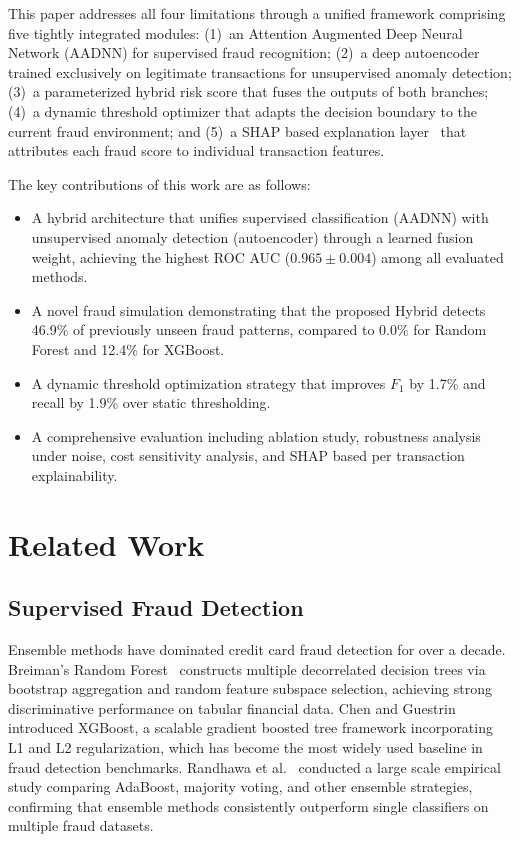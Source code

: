 \documentclass[conference]{IEEEtran}
\begin{document}
This paper addresses all four limitations through a unified framework comprising five tightly integrated modules: (1)~an Attention Augmented Deep Neural Network (AADNN) for supervised fraud recognition; (2)~a deep autoencoder trained exclusively on legitimate transactions for unsupervised anomaly detection; (3)~a parameterized hybrid risk score that fuses the outputs of both branches; (4)~a dynamic threshold optimizer that adapts the decision boundary to the current fraud environment; and (5)~a SHAP based explanation layer~\cite{lundberg2017unified} that attributes each fraud score to individual transaction features.

The key contributions of this work are as follows:

\begin{itemize}
\item A hybrid architecture that unifies supervised classification (AADNN) with unsupervised anomaly detection (autoencoder) through a learned fusion weight, achieving the highest ROC AUC ($0.965 \pm 0.004$) among all evaluated methods.
\item A novel fraud simulation demonstrating that the proposed Hybrid detects 46.9\% of previously unseen fraud patterns, compared to 0.0\% for Random Forest and 12.4\% for XGBoost.
\item A dynamic threshold optimization strategy that improves $F_1$ by 1.7\% and recall by 1.9\% over static thresholding.
\item A comprehensive evaluation including ablation study, robustness analysis under noise, cost sensitivity analysis, and SHAP based per transaction explainability.
\end{itemize}

\section{Related Work}
\label{sec:related}

\subsection{Supervised Fraud Detection}

Ensemble methods have dominated credit card fraud detection for over a decade. Breiman's Random Forest~\cite{breiman2001random} constructs multiple decorrelated decision trees via bootstrap aggregation and random feature subspace selection, achieving strong discriminative performance on tabular financial data. Chen and Guestrin~\cite{chen2016xgboost} introduced XGBoost, a scalable gradient boosted tree framework incorporating L1 and L2 regularization, which has become the most widely used baseline in fraud detection benchmarks. Randhawa et al.~\cite{randhawa2018credit} conducted a large scale empirical study comparing AdaBoost, majority voting, and other ensemble strategies, confirming that ensemble methods consistently outperform single classifiers on multiple fraud datasets.
\end{document}
